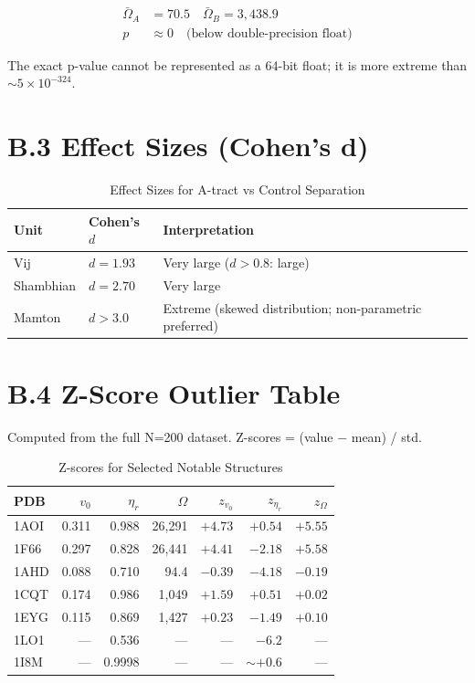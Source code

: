 \begin{align}
    \bar{\Omega}_A &= 70.5 \quad \bar{\Omega}_B = 3{,}438.9 \\
    p &\approx 0 \quad \text{(below double-precision float)}
\end{align}

The exact p-value cannot be represented as a 64-bit float; it is more extreme than $\sim 5 \times 10^{-324}$.

\section{B.3 Effect Sizes (Cohen's d)}

\begin{table}[h]
    \centering
    \caption{Effect Sizes for A-tract vs Control Separation}
    \begin{tabular}{lll}
        \toprule
        \textbf{Unit} & \textbf{Cohen's $d$} & \textbf{Interpretation} \\
        \midrule
        Vij       & $d = 1.93$ & Very large ($d > 0.8$: large) \\
        Shambhian & $d = 2.70$ & Very large \\
        Mamton    & $d > 3.0$  & Extreme (skewed distribution; non-parametric preferred) \\
        \bottomrule
    \end{tabular}
\end{table}

\section{B.4 Z-Score Outlier Table}

Computed from the full N=200 dataset. Z-scores = (value $-$ mean) / std.

\begin{table}[h]
    \centering
    \caption{Z-scores for Selected Notable Structures}
    \begin{tabular}{lrrrrrr}
        \toprule
        \textbf{PDB} & $v_0$ & $\eta_r$ & $\Omega$ & $z_{v_0}$ & $z_{\eta_r}$ & $z_\Omega$ \\
        \midrule
        1AOI & 0.311 & 0.988 & 26,291 & $+4.73$ & $+0.54$ & $+5.55$ \\
        1F66 & 0.297 & 0.828 & 26,441 & $+4.41$ & $-2.18$ & $+5.58$ \\
        1AHD & 0.088 & 0.710 & 94.4   & $-0.39$ & $-4.18$ & $-0.19$ \\
        1CQT & 0.174 & 0.986 & 1,049  & $+1.59$ & $+0.51$ & $+0.02$ \\
        1EYG & 0.115 & 0.869 & 1,427  & $+0.23$ & $-1.49$ & $+0.10$ \\
        1LO1 & ---   & 0.536 & ---    & ---     & $-6.2$  & ---     \\
        1I8M & ---   & 0.9998 & ---   & ---     & $\sim+0.6$ & ---  \\
        \bottomrule
    \end{tabular}
\end{table}

